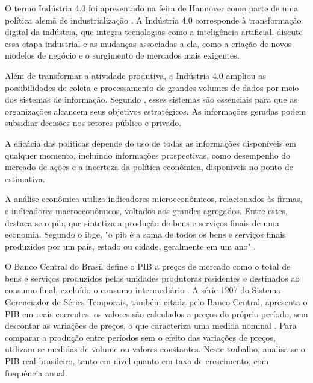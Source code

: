 O termo Indústria 4.0 foi apresentado na feira de Hannover como parte de uma política alemã de industrialização . A Indústria 4.0 corresponde à transformação digital da indústria, que integra tecnologias como a inteligência artificial.  discute essa etapa industrial e as mudanças associadas a ela, como a criação de novos modelos de negócio e o surgimento de mercados mais exigentes.

Além de transformar a atividade produtiva, a Indústria 4.0 ampliou as possibilidades de coleta e processamento de grandes volumes de dados por meio dos sistemas de informação.
Segundo , esses sistemas são essenciais para que as organizações alcancem seus objetivos estratégicos. As informações geradas podem subsidiar decisões nos setores público e privado.

\begin{citacao}
	A eficácia das políticas depende do uso de todas as informações disponíveis em qualquer momento, incluindo informações prospectivas, como desempenho do mercado de ações e a incerteza da política econômica, disponíveis no ponto de estimativa. 
\end{citacao}

A análise econômica utiliza indicadores microeconômicos, relacionados às firmas, e indicadores macroeconômicos, voltados aos grandes agregados. Entre estes, destaca-se o \ac{pib}, que sintetiza a produção de bens e serviços finais de uma economia. Segundo o \ac{ibge}, "o \ac{pib} é a soma de todos os bens e serviços finais produzidos por um país, estado ou cidade, geralmente em um ano" .

O Banco Central do Brasil define o PIB a preços de mercado como o total de bens e serviços produzidos pelas unidades produtoras residentes e destinados ao consumo final, excluído o consumo intermediário . A série 1207 do Sistema Gerenciador de Séries Temporais, também citada pelo Banco Central, apresenta o PIB em reais correntes: os valores são calculados a preços do próprio período, sem descontar as variações de preços, o que caracteriza uma medida nominal . Para comparar a produção entre períodos sem o efeito das variações de preços, utilizam-se medidas de volume ou valores constantes. Neste trabalho, analisa-se o PIB real brasileiro, tanto em nível quanto em taxa de crescimento, com frequência anual.

